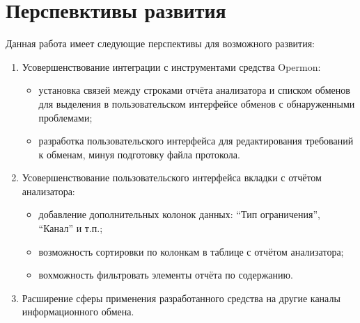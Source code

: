 \section{Перспевктивы развития} 

Данная работа имеет следующие перспективы для возможного развития:

\begin{enumerate}
 \item Усовершенствование интеграции с  инструментами средства Opermon:
 \begin{itemize}
  \item установка связей между строками отчёта анализатора и списком обменов 
для выделения в пользовательском интерфейсе обменов с обнаруженными проблемами;
  \item разработка пользовательского интерфейса для редактирования требований к 
обменам, минуя подготовку файла протокола.
 \end{itemize}
 
 \item Усовершенствование пользовательского интерфейса вкладки с отчётом 
анализатора:
 \begin{itemize}
  \item добавление дополнительных колонок данных: ``Тип ограничения'', 
``Канал'' и т.п.;
  \item возможность сортировки по колонкам в таблице с отчётом анализатора;
  \item вохможность фильтровать элементы отчёта по содержанию.
 \end{itemize}

 \item Расширение сферы применения разработанного средства на другие каналы 
информационного обмена.
\end{enumerate}

